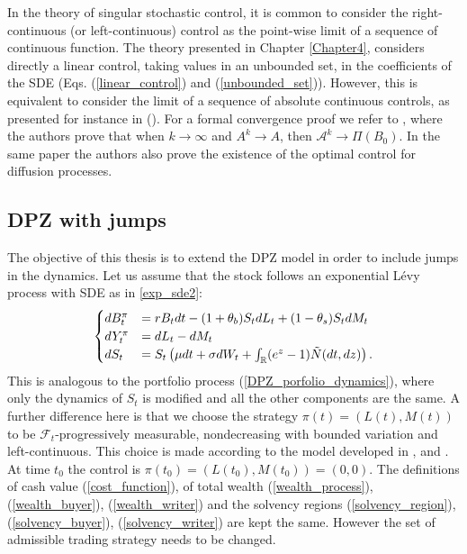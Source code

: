 \begin{Remark}\label{RemarkDPZ}
 In the theory of singular stochastic control, it is common to consider the right-continuous (or left-continuous) control as the point-wise limit of a sequence of continuous function.
 The theory presented in Chapter \ref{Chapter4}, considers directly a linear control, taking values in an unbounded set, in the coefficients of the SDE (Eqs. (\ref{linear_control}) 
 and (\ref{unbounded_set})). 
 However, this is equivalent to consider the limit of a sequence of absolute continuous controls, as presented for instance in (\cite{DaPaZa93}). 
 For a formal convergence proof we refer to \cite{BuRo06}, where the authors prove that when $k\to \infty$ and $A^k \to A$, then $\mathcal{A}^k \to \Pi(B_0)$.  
 In the same paper the authors also prove the existence of the optimal control for diffusion processes.
\end{Remark}



\subsection{DPZ with jumps}\label{DPZ_j_sec}


The objective of this thesis is to extend the DPZ model in order to include jumps in the dynamics. Let us assume that the stock follows an exponential Lévy process with SDE 
as in \ref{exp_sde2}:
\begin{equation}\label{porfolio_dynamics}
 \begin{cases}
 dB^{\pi}_t &=  rB_t dt - (1+\theta_b)S_t dL_t + (1-\theta_s) S_t dM_t \\
 dY^{\pi}_t &=  dL_t - dM_t \\
 dS_t &=  S_t \left( \mu dt + \sigma dW_t + \int_{\mathbb{R}} (e^z-1) \tilde N(dt,dz) \right).
\end{cases}
\end{equation} 
This is analogous to the portfolio process (\ref{DPZ_porfolio_dynamics}), where only the dynamics of $S_t$ is modified and all the other components are the same.
A further difference here is that we choose the
strategy $\pi(t) = (L(t),M(t))$ to be $\mathcal{F}_t$-progressively measurable, nondecreasing with bounded variation and left-continuous. This choice is made according to the model 
developed in \cite{ShSo94}, \cite{FlemingSoner} and \cite{BaSo98}.
At time $t_0$ the control is $ \pi(t_0) = ( L(t_0) , M(t_0) ) = (0,0) $.
The definitions of cash value (\ref{cost_function}), of total wealth (\ref{wealth_process}), (\ref{wealth_buyer}), (\ref{wealth_writer}) and the solvency regions
(\ref{solvency_region}), (\ref{solvency_buyer}), (\ref{solvency_writer}) are kept the same. However the set of admissible trading strategy needs to be changed.

